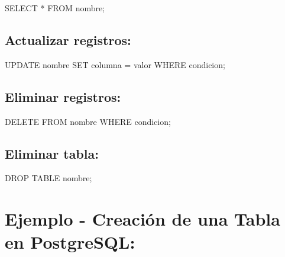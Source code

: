 \documentclass[
  a4paper,
  DIV=11,
  numbers=noendperiod,
  onepage,
  openany]{scrreprt}
\newenvironment{Shaded}{\begin{snugshade}}{\end{snugshade}}
\newcommand{\KeywordTok}[1]{\textcolor[rgb]{0.00,0.23,0.31}{#1}}
\newcommand{\NormalTok}[1]{\textcolor[rgb]{0.00,0.23,0.31}{#1}}
\newcommand{\OperatorTok}[1]{\textcolor[rgb]{0.37,0.37,0.37}{#1}}
\begin{document}
\begin{Shaded}
\begin{Highlighting}[]
\KeywordTok{SELECT} \OperatorTok{*} \KeywordTok{FROM}\NormalTok{ nombre;}
\end{Highlighting}
\end{Shaded}

\hypertarget{actualizar-registros-5}{%
\subsection{Actualizar registros:}\label{actualizar-registros-5}}

\begin{Shaded}
\begin{Highlighting}[]
\KeywordTok{UPDATE}\NormalTok{ nombre }\KeywordTok{SET}\NormalTok{ columna }\OperatorTok{=}\NormalTok{ valor }\KeywordTok{WHERE}\NormalTok{ condicion;}
\end{Highlighting}
\end{Shaded}

\hypertarget{eliminar-registros-5}{%
\subsection{Eliminar registros:}\label{eliminar-registros-5}}

\begin{Shaded}
\begin{Highlighting}[]
\KeywordTok{DELETE} \KeywordTok{FROM}\NormalTok{ nombre }\KeywordTok{WHERE}\NormalTok{ condicion;}
\end{Highlighting}
\end{Shaded}

\hypertarget{eliminar-tabla-3}{%
\subsection{Eliminar tabla:}\label{eliminar-tabla-3}}

\begin{Shaded}
\begin{Highlighting}[]
\KeywordTok{DROP} \KeywordTok{TABLE}\NormalTok{ nombre;}
\end{Highlighting}
\end{Shaded}

\hypertarget{ejemplo---creaciuxf3n-de-una-tabla-en-postgresql-3}{%
\section{Ejemplo - Creación de una Tabla en
PostgreSQL:}\label{ejemplo---creaciuxf3n-de-una-tabla-en-postgresql-3}}
\end{document}
